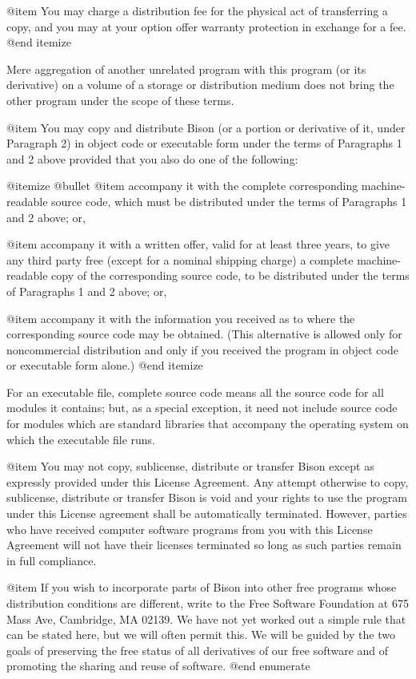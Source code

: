 @item
You may charge a distribution fee for the physical act of
transferring a copy, and you may at your option offer warranty
protection in exchange for a fee.
@end itemize

Mere aggregation of another unrelated program with this program (or its
derivative) on a volume of a storage or distribution medium does not bring
the other program under the scope of these terms.

@item
You may copy and distribute Bison (or a portion or derivative of it,
under Paragraph 2) in object code or executable form under the terms
of Paragraphs 1 and 2 above provided that you also do one of the
following:

@itemize @bullet
@item
accompany it with the complete corresponding machine-readable
source code, which must be distributed under the terms of
Paragraphs 1 and 2 above; or,

@item
accompany it with a written offer, valid for at least three
years, to give any third party free (except for a nominal
shipping charge) a complete machine-readable copy of the
corresponding source code, to be distributed under the terms of
Paragraphs 1 and 2 above; or,

@item
accompany it with the information you received as to where the
corresponding source code may be obtained.  (This alternative is
allowed only for noncommercial distribution and only if you
received the program in object code or executable form alone.)
@end itemize

For an executable file, complete source code means all the source code
for all modules it contains; but, as a special exception, it need not
include source code for modules which are standard libraries that
accompany the operating system on which the executable file runs.

@item
You may not copy, sublicense, distribute or transfer Bison except as
expressly provided under this License Agreement.  Any attempt
otherwise to copy, sublicense, distribute or transfer Bison is void
and your rights to use the program under this License agreement shall
be automatically terminated.  However, parties who have received
computer software programs from you with this License Agreement will
not have their licenses terminated so long as such parties remain in
full compliance.

@item
If you wish to incorporate parts of Bison into other free programs
whose distribution conditions are different, write to the Free Software
Foundation at 675 Mass Ave, Cambridge, MA 02139.  We have not yet worked
out a simple rule that can be stated here, but we will often permit this.
We will be guided by the two goals of preserving the free status of all
derivatives of our free software and of promoting the sharing and reuse of
software.
@end enumerate

